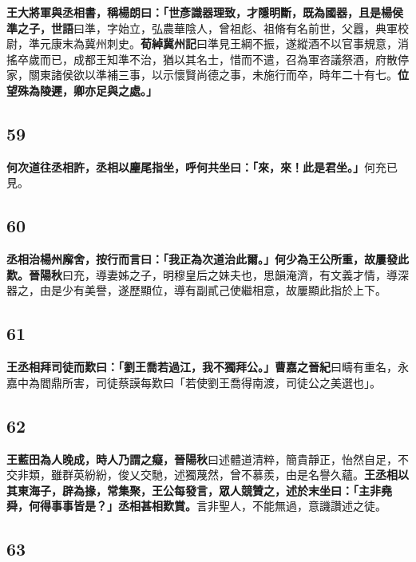\textbf{王大將軍與丞相書，稱楊朗曰：「世彥識器理致，才隱明斷，既為國器，且是楊侯準之子，}{\footnotesize \textbf{世語}曰準，字始立，弘農華陰人，曾祖彪、祖脩有名前世，父囂，典軍校尉，準元康末為冀州刺史。\textbf{荀綽冀州記}曰準見王綱不振，遂縱酒不以官事規意，消搖卒歲而已，成都王知準不治，猶以其名士，惜而不遣，召為軍咨議祭酒，府散停家，關東諸侯欲以準補三事，以示懷賢尚德之事，未施行而卒，時年二十有七。}\textbf{位望殊為陵遲，卿亦足與之處。」}

\subsection*{59}

\textbf{何次道往丞相許，丞相以麈尾指坐，呼何共坐曰：「來，來！此是君坐。」}{\footnotesize 何充已見。}

\subsection*{60}

\textbf{丞相治楊州廨舍，按行而言曰：「我正為次道治此爾。」何少為王公所重，故屢發此歎。}{\footnotesize \textbf{晉陽秋}曰充，導妻姊之子，明穆皇后之妹夫也，思韻淹濟，有文義才情，導深器之，由是少有美譽，遂歷顯位，導有副貳己使繼相意，故屢顯此指於上下。}

\subsection*{61}

\textbf{王丞相拜司徒而歎曰：「劉王喬若過江，我不獨拜公。」}{\footnotesize \textbf{曹嘉之晉紀}曰疇有重名，永嘉中為閻鼎所害，司徒蔡謨每歎曰「若使劉王喬得南渡，司徒公之美選也」。}

\subsection*{62}

\textbf{王藍田為人晚成，時人乃謂之癡，}{\footnotesize \textbf{晉陽秋}曰述體道清粹，簡貴靜正，怡然自足，不交非類，雖群英紛紛，俊乂交馳，述獨蔑然，曾不慕羨，由是名譽久蘊。}\textbf{王丞相以其東海子，辟為掾，常集聚，王公每發言，眾人競贊之，述於末坐曰：「主非堯舜，何得事事皆是？」丞相甚相歎賞。}{\footnotesize 言非聖人，不能無過，意譏讚述之徒。}

\subsection*{63}

